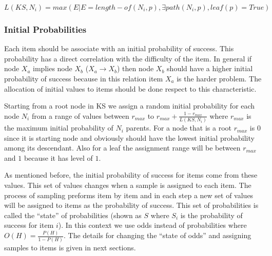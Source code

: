 \begin{equation}
L(KS,N_{i}) = max(E|E=length-of(N_{i},p)  ,  \exists path(N_{i},p)  , leaf(p)=True)
\label{EQ:Level}
\end{equation}



\subsubsection{Initial Probabilities}

Each item should be associate with an initial probability of success. This probability has a direct correlation with the difficulty of the item. In general if node $X_a$ implies node $X_b$ ($X_a \rightarrow X_b$) then node $X_b$ should have a higher initial probability of success because in this relation item $X_a$ is the harder problem. The allocation of initial values to items should be done respect to this characteristic. 

Starting from a root node in KS we assign a random initial probability  for each node $N_{i}$ from a range of values between $r_{max}$ to $r_{max}+\frac{1-r_{max}}{L(KS,N_{i})}$ where $r_{max}$ is the maximum initial probability of $N_{i}$ parents. For a node that is a root $r_{max}$ is $0$ since it is starting node and obviously should have the lowest initial probability among its descendant. Also for a leaf the assignment range will be between $r_{max}$ and $1$ because it has level of $1$. 

As mentioned before, the initial probability of success for items come from these values. This set of values changes when a sample is assigned to each item. The process of sampling preforms item by item and in each step a new set of values will be assigned to items as the probability of success. This set of probabilities is called the ``state'' of probabilities (shown as $S$ where $S_i$ is the probability of success for item $i$). In this context we use odds instead of probabilities where $O(H) = \frac{P(H)}{1-P(H)}$. The details for changing the ``state of odds'' and assigning samples to items is given in next sections.

